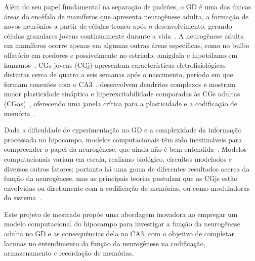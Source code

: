 Além do seu papel fundamental na separação de padrões, o GD é uma das únicas áreas do encéfalo de mamíferos que apresenta
neurogênese adulta, a formação de novos neurônios a partir de células-tronco após o desenvolvimento, gerando células granulares
jovens continuamente durante a vida~\cite{boldriniHuman2018}. A neurogênese adulta em mamíferos ocorre apenas em algumas outras
áreas específicas, como no bulbo olfatório em roedores e possivelmente no estriado, amígdala e hipotálamo em
humanos~\cite{alonsoImpact2024, jurkowskiHippocampus2020}. CGs jovens (CGj) apresentam características eletrofisiológicas
distintas cerca de quatro a seis semanas após o nascimento, período em que formam conexões com o CA3~\cite{zhaoDistinct2006},
desenvolvem dendritos complexos e mostram maior plasticidade sináptica e hiperexcitabilidade comparadas às CGs adultas
(CGas)~\cite{aimoneRegulation2014}, oferecendo uma janela crítica para a plasticidade e a codificação de
memória~\cite{berdugo-vegaSharpening2023}.

Dada a dificuldade de experimentação no GD e a complexidade da informação processada no hipocampo, modelos computacionais têm sido
inestimáveis para compreender o papel da neurogênese, que ainda não é bem entendida~\cite{aimoneComputational2016}. Modelos computacionais variam
em escala, realismo biológico, circuitos modelados e diversos outros fatores; portanto há uma gama de diferentes resultados acerca
da função da neurogênese, mas as principais teorias postulam que as CGjs estão envolvidas ou diretamente com a codificação de
memórias, ou como moduladoras do sistema~\cite{aimoneComputational2016, berdugo-vegaSharpening2023}.

Este projeto de mestrado propõe uma abordagem inovadora ao empregar um modelo computacional do hipocampo para investigar a função da neurogênese adulta no GD e as consequências dela no CA3, com o objetivo de
completar lacunas no entendimento da função da neurogênese na codificação, armazenamento e recordação de memórias.

